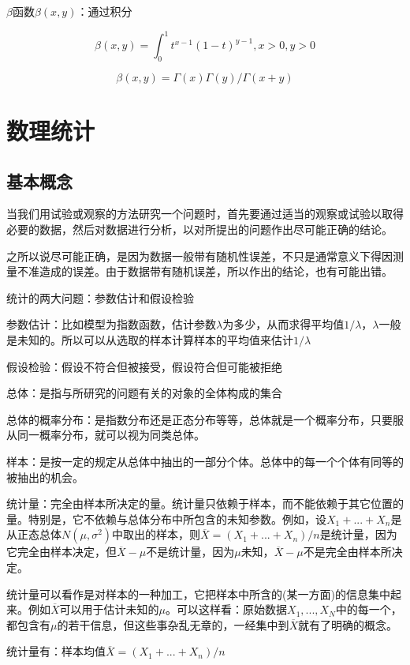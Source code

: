 \documentclass{ctexart}
\begin{document}
	\(\beta\)函数\(\beta(x,y)\)：通过积分
	
	\[\beta(x,y)=\int_{0}^{1}t^{x-1}(1-t)^{y-1}, x > 0, y > 0\]
	
	\[\beta(x,y)=\Gamma(x)\Gamma(y)/\Gamma(x+y)\]
	
	
	
	\section{数理统计}
	
	\subsection{基本概念}
	当我们用试验或观察的方法研究一个问题时，首先要通过适当的观察或试验以取得必要的数据，然后对数据进行分析，以对所提出的问题作出尽可能正确的结论。
	
	之所以说尽可能正确，是因为数据一般带有随机性误差，不只是通常意义下得因测量不准造成的误差。由于数据带有随机误差，所以作出的结论，也有可能出错。
	
	统计的两大问题：参数估计和假设检验
	
	参数估计：比如模型为指数函数，估计参数\(\lambda\)为多少，从而求得平均值\(1/\lambda\)，\(\lambda\)一般是未知的。所以可以从选取的样本计算样本的平均值来估计\(1/\lambda\)
	
	假设检验：假设不符合但被接受，假设符合但可能被拒绝
	
	总体：是指与所研究的问题有关的对象的全体构成的集合
	
	总体的概率分布：是指数分布还是正态分布等等，总体就是一个概率分布，只要服从同一概率分布，就可以视为同类总体。
	
	样本：是按一定的规定从总体中抽出的一部分个体。总体中的每一个个体有同等的被抽出的机会。
	
	统计量：完全由样本所决定的量。统计量只依赖于样本，而不能依赖于其它位置的量。{\color{red}特别是，它不依赖与总体分布中所包含的未知参数}。例如，设\(X_1+...+X_n\)是从正态总体\(N(\mu, \sigma^2)\)中取出的样本，则\(\overline{X} = (X_1+...+X_n)/n\)是统计量，因为它完全由样本决定，但\(\overline{X}-\mu\)不是统计量，因为\(\mu\)未知，\(\overline{X}-\mu\)不是完全由样本所决定。
	
	统计量可以看作是对样本的一种加工，它把样本中所含的(某一方面)的信息集中起来。例如\(\overline{X}\)可以用于估计未知的\(\mu\)。可以这样看：原始数据\(X_1,...,X_N\)中的每一个，都包含有\(\mu\)的若干信息，但这些事杂乱无章的，一经集中到\(\overline{X}\)就有了明确的概念。
	
	统计量有：样本均值\(\overline{X}=(X_1+...+X_n)/n\)
	
\end{document}

